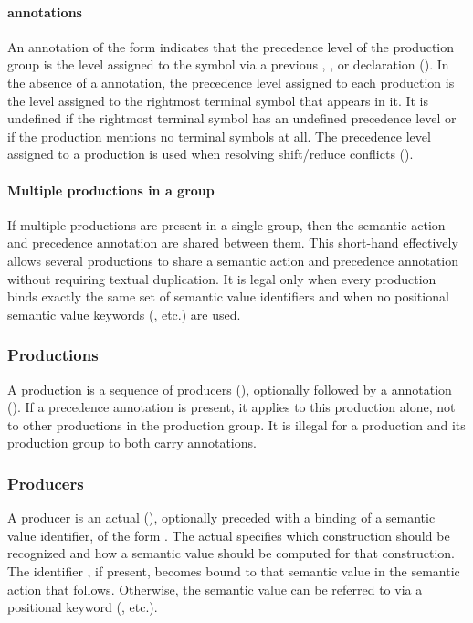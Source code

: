 \documentclass[onecolumn,11pt,nocopyrightspace,preprint]{sigplanconf}
\begin{document}
\paragraph{\dprec annotations}
\label{sec:prec}

An annotation of the form \dprec {} indicates that the precedence level
of the production group is the level assigned to the symbol  via a
previous \dnonassoc, \dleft, or \dright declaration (). In the
absence of a
\dprec annotation, the precedence level assigned to each production is the
level assigned to the rightmost terminal symbol that appears in it. It is
undefined if the rightmost terminal symbol has an undefined precedence level
or if the production mentions no terminal symbols at all. The precedence level
assigned to a production is used when resolving shift/reduce conflicts
().

\paragraph{Multiple productions in a group}

If multiple productions are present in a single group, then the semantic
action and precedence annotation are shared between them. This short-hand
effectively allows several productions to share a semantic action and
precedence annotation without requiring textual duplication. It is legal only
when every production binds exactly the same set of semantic value identifiers
and when no positional semantic value keywords (, etc.) are used.

\subsubsection{Productions}
\label{sec:productions}

A production is a sequence of producers (), optionally
followed by a \dprec annotation (). If a precedence annotation
is present, it applies to this production alone, not to other productions in
the production group. It is illegal for a production and its production group
to both carry \dprec annotations.

\subsubsection{Producers}
\label{sec:producers}

A producer is an actual (), optionally preceded with a
binding of a semantic value identifier, of the form  \dequal. The
actual specifies which construction should be recognized and how a semantic
value should be computed for that construction. The identifier , if
present, becomes bound to that semantic value in the semantic action that
follows. Otherwise, the semantic value can be referred to via a positional
keyword (, etc.).
\end{document}
